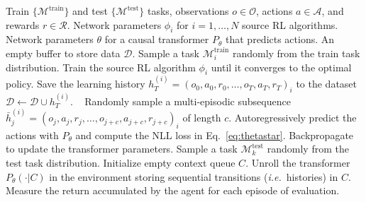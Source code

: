 \documentclass{article}
\theoremstyle{thm}
\newcommand{\algo}{\ensuremath{P}}
\newcommand{\ie}{{\it i.e.}}
\begin{document}
\begin{algorithm}[h]
\caption{\texttt{Algorithm Distillation}} \label{alg:ad_full}
\begin{algorithmic}[1]
\footnotesize
\Require Train $\{ \mathcal M^{\text{train}} \}$ and test $\{ \mathcal M^{\text{test}} \}$ tasks, observations $o \in \mathcal O$, actions $a \in \mathcal A$, and rewards $r \in \mathcal R$.
\Require Network parameters $\phi_i$ for $i=1,\dots, N$ source RL algorithms.
\Require Network parameters $\theta$ for a causal transformer $\algo_{\theta}$ that predicts actions.
\Require An empty buffer to store data $\mathcal D$.
 
\State Sample a task $\mathcal{M}^{\text{train}}_i$ randomly from the train task distribution.
\State Train the source RL algorithm $\phi_i$ until it converges to the optimal policy.
\State Save the learning history $h^{(i)}_{T} = \left( o_{0}, a_{0}, r_{0}, \ldots, o_{T}, a_{T}, r_{T} \right)_i$ to the dataset $\mathcal D \leftarrow \mathcal D \cup h^{(i)}_T $.
\EndFor
\
 
\State Randomly sample a multi-episodic subsequence $\bar h^{(i)}_j = \left( o_{j}, a_{j}, r_{j}, \ldots, o_{j+c}, a_{j+c}, r_{j+c} \right)_i$ of length $c$.
\State  Autoregressively predict the actions with $\algo_\theta$ and compute the NLL loss in Eq.~\ref{eq:thetastar}.
\State Backpropagate to update the transformer parameters.
\EndWhile
{}  
\State Sample a task $\mathcal{M}^{\text{test}}_k$ randomly from the test task distribution. Initialize empty context queue $C$.
\State Unroll the transformer $P_\theta (\cdot | C)$ in the environment  storing sequential transitions (\ie\, histories) in $C$.
\State Measure the return accumulated by the agent for each episode of evaluation.
\EndFor
\end{algorithmic}
\end{algorithm}
\end{document}
